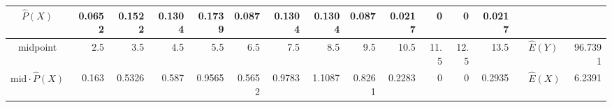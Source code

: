 \begin{table}[ht]
\begin{adjustbox}{width = \textwidth, center}
\begin{tabular}{|cc|r|r|r|r|r|r|r|r|r|r|r|r|r|r|r|}
            \multicolumn{2}{|c|}{\cellcolor[HTML]{FCE5CD}$\widehat{P}(X)$}                  & \cellcolor[HTML]{FCE5CD}0.0652                 & \cellcolor[HTML]{FCE5CD}0.1522                 & \cellcolor[HTML]{FCE5CD}0.1304                 & \cellcolor[HTML]{FCE5CD}0.1739                 & \cellcolor[HTML]{FCE5CD}0.087                  & \cellcolor[HTML]{FCE5CD}0.1304                 & \cellcolor[HTML]{FCE5CD}0.1304                 & \cellcolor[HTML]{FCE5CD}0.087                   & \cellcolor[HTML]{FCE5CD}0.0217                  & \cellcolor[HTML]{FCE5CD}0                       & \cellcolor[HTML]{FCE5CD}0                       & \cellcolor[HTML]{FCE5CD}0.0217                  & \multicolumn{1}{l|}{}                                                           & \multicolumn{1}{l|}{}                                                   & \multicolumn{1}{l|}{}                                                                 \\ \hline
            \multicolumn{2}{|c|}{\cellcolor[HTML]{FCE5CD}midpoint}                          & \cellcolor[HTML]{FCE5CD}2.5                    & \cellcolor[HTML]{FCE5CD}3.5                    & \cellcolor[HTML]{FCE5CD}4.5                    & \cellcolor[HTML]{FCE5CD}5.5                    & \cellcolor[HTML]{FCE5CD}6.5                    & \cellcolor[HTML]{FCE5CD}7.5                    & \cellcolor[HTML]{FCE5CD}8.5                    & \cellcolor[HTML]{FCE5CD}9.5                     & \cellcolor[HTML]{FCE5CD}10.5                    & \cellcolor[HTML]{FCE5CD}11.5                    & \cellcolor[HTML]{FCE5CD}12.5                    & \cellcolor[HTML]{FCE5CD}13.5                    & \multicolumn{1}{l|}{}                                                           & \multicolumn{1}{l|}{\cellcolor[HTML]{D0E0E3}$\widehat{E}(Y)$}           & \cellcolor[HTML]{D0E0E3}96.7391                                                       \\ \hline
            \multicolumn{2}{|c|}{\cellcolor[HTML]{FCE5CD}$\mathrm{mid}\cdot\widehat{P}(X)$} & \cellcolor[HTML]{FCE5CD}0.163                  & \cellcolor[HTML]{FCE5CD}0.5326                 & \cellcolor[HTML]{FCE5CD}0.587                  & \cellcolor[HTML]{FCE5CD}0.9565                 & \cellcolor[HTML]{FCE5CD}0.5652                 & \cellcolor[HTML]{FCE5CD}0.9783                 & \cellcolor[HTML]{FCE5CD}1.1087                 & \cellcolor[HTML]{FCE5CD}0.8261                  & \cellcolor[HTML]{FCE5CD}0.2283                  & \cellcolor[HTML]{FCE5CD}0                       & \cellcolor[HTML]{FCE5CD}0                       & \cellcolor[HTML]{FCE5CD}0.2935                  & \multicolumn{1}{l|}{}                                                           & \multicolumn{1}{l|}{\cellcolor[HTML]{D0E0E3}$\widehat{E}(X)$}           & \cellcolor[HTML]{D0E0E3}6.2391                                                        \\ \hline
            \end{tabular}
    \end{adjustbox}
\end{table}\\
